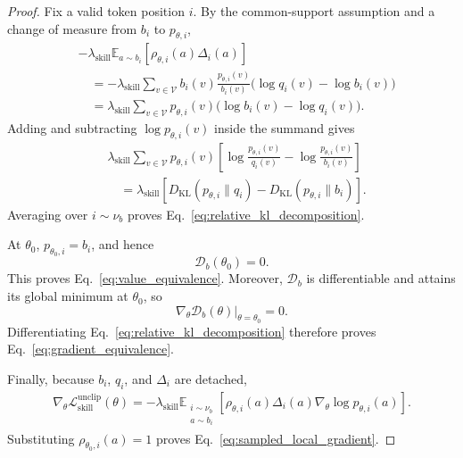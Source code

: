 \documentclass{llmxive}
\begin{document}
\begin{proof}
Fix a valid token position \(i\). By the common-support assumption and a
change of measure from \(b_i\) to \(p_{\theta,i}\),
\begin{align*}
 &-
 \lambda_{\mathrm{skill}}
 \mathbb E_{a\sim b_i}
 \left[
   \rho_{\theta,i}(a)\Delta_i(a)
 \right]
 \\
 &\quad=
 -
 \lambda_{\mathrm{skill}}
 \sum_{v\in\mathcal V}
 b_i(v)
 \frac{p_{\theta,i}(v)}{b_i(v)}
 \bigl(
   \log q_i(v)-\log b_i(v)
 \bigr)
 \\
 &\quad=
 \lambda_{\mathrm{skill}}
 \sum_{v\in\mathcal V}
 p_{\theta,i}(v)
 \bigl(
   \log b_i(v)-\log q_i(v)
 \bigr).
\end{align*}
Adding and subtracting \(\log p_{\theta,i}(v)\) inside the summand gives
\begin{align*}
 &\lambda_{\mathrm{skill}}
 \sum_{v\in\mathcal V}
 p_{\theta,i}(v)
 \left[
   \log\frac{p_{\theta,i}(v)}{q_i(v)}
   -
   \log\frac{p_{\theta,i}(v)}{b_i(v)}
 \right]
 \\
 &\quad=
 \lambda_{\mathrm{skill}}
 \left[
   D_{\mathrm{KL}}(p_{\theta,i}\|q_i)
   -
   D_{\mathrm{KL}}(p_{\theta,i}\|b_i)
 \right].
\end{align*}
Averaging over \(i\sim\nu_b\) proves
Eq.~\ref{eq:relative_kl_decomposition}.

At \(\theta_0\), \(p_{\theta_0,i}=b_i\), and hence
\begin{equation*}
 \mathcal D_b(\theta_0)=0.
\end{equation*}
This proves Eq.~\ref{eq:value_equivalence}. Moreover,
\(\mathcal D_b\) is differentiable and attains its global minimum at
\(\theta_0\), so
\begin{equation*}
 \left.
 \nabla_\theta\mathcal D_b(\theta)
 \right|_{\theta=\theta_0}
 =0.
\end{equation*}
Differentiating Eq.~\ref{eq:relative_kl_decomposition} therefore proves
Eq.~\ref{eq:gradient_equivalence}.

Finally, because \(b_i\), \(q_i\), and \(\Delta_i\) are detached,
\begin{equation*}
\begin{aligned}
 \nabla_\theta
 \mathcal L_{\mathrm{skill}}^{\mathrm{unclip}}(\theta)
 =
 -
 \lambda_{\mathrm{skill}}
 \mathbb E_{\substack{i\sim\nu_b\\a\sim b_i}}
 \left[
   \rho_{\theta,i}(a)\Delta_i(a)
   \nabla_\theta\log p_{\theta,i}(a)
 \right].
\end{aligned}
\end{equation*}
Substituting
\(\rho_{\theta_0,i}(a)=1\) proves
Eq.~\ref{eq:sampled_local_gradient}.
\end{proof}
\end{document}
